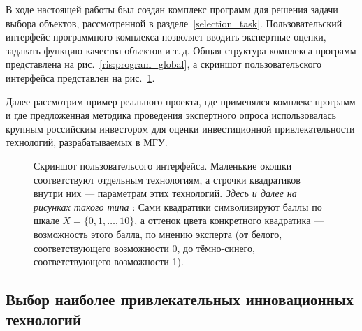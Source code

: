 
\label{sec:examples}

В ходе настоящей работы был создан комплекс программ для решения задачи выбора объектов, рассмотренной в разделе~\ref{selection_task}. Пользовательский интерфейс программного комплекса позволяет вводить экспертные оценки, задавать функцию качества объектов и т.\,д. Общая структура комплекса программ представлена на рис.~\ref{ris:program_global}, а скриншот пользовательского интерфейса представлен на рис.~\ref{ris:interface}.

Далее рассмотрим пример реального проекта, где применялся комплекс программ и где предложенная методика проведения экспертного опроса использовалась крупным российским инвестором для оценки инвестиционной привлекательности технологий, разрабатываемых в МГУ.

\begin{figure}[h]
\caption{\small Скриншот пользовательсого интерфейса. Маленькие окошки соответствуют отдельным технологиям, а строчки квадратиков внутри них --- параметрам этих технологий. {\sl Здесь и далее на рисунках такого типа }: Сами квадратики символизируют баллы по шкале $X = \{0, 1, \ldots, 10\}$, а оттенок цвета конкретного квадратика --- возможность этого балла, по мнению эксперта (от белого, соответствующего возможности 0, до тёмно-синего, соответствующего возможности 1). }
\label{ris:interface}
\end{figure}

\subsection{Выбор наиболее привлекательных инновационных технологий}

